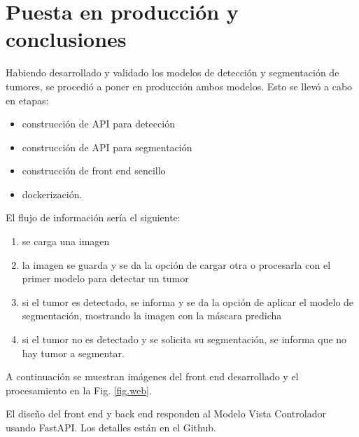 
\chapter{Puesta en producción y conclusiones}

Habiendo desarrollado y validado los modelos de detección y segmentación de tumores, se procedió a poner en producción ambos modelos. Esto se llevó a cabo en etapas:

\begin{itemize}

\item construcción de API para detección
\item construcción de API para segmentación
\item construcción de front end sencillo
\item dockerización.
\end{itemize}

El flujo de información sería el siguiente:

\begin{enumerate}
    \item se carga una imagen 
    \item la imagen se guarda y se da la opción de cargar otra o procesarla con el primer modelo para detectar un tumor
    \item si el tumor es detectado, se informa y se da la opción de aplicar el modelo de segmentación, mostrando la imagen con la máscara predicha
    \item si el tumor no es detectado y se solicita su segmentación, se informa que no hay tumor a segmentar.
\end{enumerate}

A continuación se muestran imágenes del front end desarrollado y el procesamiento en la Fig. \ref{fig.web}.

El diseño del front end y back end responden al Modelo Vista Controlador usando FastAPI. Los detalles están en el Github. 

